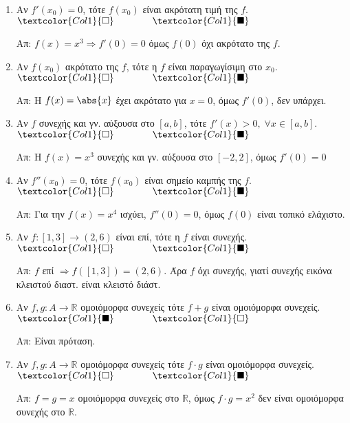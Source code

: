\documentclass[a4paper,table]{report}
\begin{document}
\begin{enumerate}[itemsep=.5\baselineskip]
  \item \textcolor{Col1}{Αν $ f'(x_{0}) = 0 $, τότε $ f(x_{0}) $ είναι ακρότατη τιμή
    της $f$}.
    \hfill $\textcolor{Col1}{\square} \qquad \qquad \textcolor{Col1}{\blacksquare}$

    Απ: $ f(x)=x^{3} \Rightarrow f'(0)=0 $ όμως $ f(0) $ όχι ακρότατο της $f$. 

  \item \textcolor{Col1}{Αν $ f(x_{0}) $ ακρότατο της $f$, τότε η $f$ είναι
    παραγωγίσιμη στο $ x_{0} $}.
    \hfill $\textcolor{Col1}{\square} \qquad \qquad \textcolor{Col1}{\blacksquare}$

    Απ: Η $ f(x) = \abs{x} $ έχει ακρότατο για $ x=0 $, όμως $ f'(0) $, δεν υπάρχει.

  \item \textcolor{Col1}{Αν $f$ συνεχής και γν. αύξουσα στο $ [a,b] $, τότε $ f'(x)>0, \;
    \forall x \in [a,b] $}.
    \hfill $\textcolor{Col1}{\square} \qquad \qquad \textcolor{Col1}{\blacksquare}$

    Απ: Η $ f(x) = x^{3} $ συνεχής και γν. αύξουσα στο $ [-2,2] $, όμως $ f'(0)=0 $

  \item \textcolor{Col1}{Αν $ f''(x_{0}) = 0 $, τότε $ f(x_{0}) $ είναι σημείο καμπής 
    της $f$}.
    \hfill $\textcolor{Col1}{\square} \qquad \qquad \textcolor{Col1}{\blacksquare}$

    Απ: Για την $ f(x) = x^{4} $ ισχύει, $ f''(0)=0 $, όμως $ f(0) $ είναι τοπικό
    ελάχιστο.

  \item \textcolor{Col1}{Αν $ f \colon [1,3] \to (2,6) $ είναι επί, τότε η $f$ 
    είναι συνεχής}.
    \hfill $\textcolor{Col1}{\square} \qquad \qquad \textcolor{Col1}{\blacksquare}$

    Απ: $ f $ επί $ \Rightarrow f([1,3]) = (2,6) $. Άρα $f$ όχι συνεχής, 
    γιατί συνεχής εικόνα κλειστού διαστ. είναι κλειστό διάστ.

  \item \textcolor{Col1}{Αν $ f,g \colon A \to \mathbb{R} $ ομοιόμορφα συνεχείς τότε 
    $ f+g $ είναι ομοιόμορφα συνεχείς}.
    \hfill $\textcolor{Col1}{\blacksquare} \qquad \qquad \textcolor{Col1}{\square}$

    Απ: Είναι πρόταση.

  \item \textcolor{Col1}{Αν $ f,g \colon A \to \mathbb{R} $ ομοιόμορφα συνεχείς τότε 
    $ f\cdot g $ είναι ομοιόμορφα συνεχείς}.
    \hfill $\textcolor{Col1}{\square} \qquad \qquad \textcolor{Col1}{\blacksquare}$

    Απ: $ f=g=x $ ομοιόμορφα συνεχείς στο $\mathbb{R}$, όμως $ f\cdot g = x^{2} $ 
    δεν είναι ομοιόμορφα συνεχής στο $\mathbb{R}$.

\end{enumerate}
\end{document}

